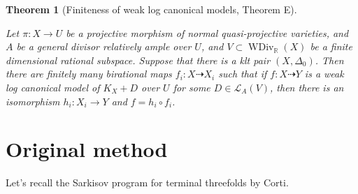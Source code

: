 \documentclass[11pt]{amsart}
\newtheorem{thm}[defn]{Theorem}
\begin{document}
\begin{thm}[Finiteness of weak log canonical models, \cite{BCHM10} Theorem E]\label{finitewlcm}

   Let $\pi:X\to U$ be a projective morphism of normal quasi-projective varieties, and $A$ be a general divisor relatively ample over $U$, and $V \subset \operatorname{WDiv}_{\mathbb{R}}(X)$ be a finite dimensional rational subspace. Suppose that there is a klt pair $(X,\Delta_{0})$. Then there are finitely many birational maps $f_{i}:X \dashrightarrow X_{i}$ such that if $f:X \dashrightarrow  Y$ is a weak log canonical model of $K_{X}+D$ over $U$ for some $D \in \mathcal{L}_{A}(V)$, then there is an isomorphism  $h_{i}:X_{i} \to Y$  and $f=h_{i}\circ f_{i}$.  

\end{thm}


\section{Original method}
Let's recall the Sarkisov program for terminal threefolds by Corti.
\end{document}
